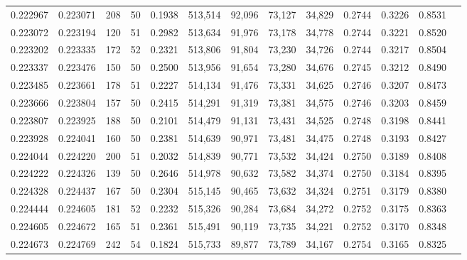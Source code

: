 \begin{tabular}{rrrrrrrrrrrrr}
0.222967 & 0.223071 &   208 &  50 &                                     0.1938 & 513,514 &  92,096 &  73,127 &  34,829 & 0.2744 & 0.3226 & 0.8531 \\
0.223072 & 0.223194 &   120 &  51 &                                     0.2982 & 513,634 &  91,976 &  73,178 &  34,778 & 0.2744 & 0.3221 & 0.8520 \\
0.223202 & 0.223335 &   172 &  52 &                                     0.2321 & 513,806 &  91,804 &  73,230 &  34,726 & 0.2744 & 0.3217 & 0.8504 \\
0.223337 & 0.223476 &   150 &  50 &                                     0.2500 & 513,956 &  91,654 &  73,280 &  34,676 & 0.2745 & 0.3212 & 0.8490 \\
0.223485 & 0.223661 &   178 &  51 &                                     0.2227 & 514,134 &  91,476 &  73,331 &  34,625 & 0.2746 & 0.3207 & 0.8473 \\
0.223666 & 0.223804 &   157 &  50 &                                     0.2415 & 514,291 &  91,319 &  73,381 &  34,575 & 0.2746 & 0.3203 & 0.8459 \\
0.223807 & 0.223925 &   188 &  50 &                                     0.2101 & 514,479 &  91,131 &  73,431 &  34,525 & 0.2748 & 0.3198 & 0.8441 \\
0.223928 & 0.224041 &   160 &  50 &                                     0.2381 & 514,639 &  90,971 &  73,481 &  34,475 & 0.2748 & 0.3193 & 0.8427 \\
0.224044 & 0.224220 &   200 &  51 &                                     0.2032 & 514,839 &  90,771 &  73,532 &  34,424 & 0.2750 & 0.3189 & 0.8408 \\
0.224222 & 0.224326 &   139 &  50 &                                     0.2646 & 514,978 &  90,632 &  73,582 &  34,374 & 0.2750 & 0.3184 & 0.8395 \\
0.224328 & 0.224437 &   167 &  50 &                                     0.2304 & 515,145 &  90,465 &  73,632 &  34,324 & 0.2751 & 0.3179 & 0.8380 \\
0.224444 & 0.224605 &   181 &  52 &                                     0.2232 & 515,326 &  90,284 &  73,684 &  34,272 & 0.2752 & 0.3175 & 0.8363 \\
0.224605 & 0.224672 &   165 &  51 &                                     0.2361 & 515,491 &  90,119 &  73,735 &  34,221 & 0.2752 & 0.3170 & 0.8348 \\
0.224673 & 0.224769 &   242 &  54 &                                     0.1824 & 515,733 &  89,877 &  73,789 &  34,167 & 0.2754 & 0.3165 & 0.8325 \\

\end{tabular}
